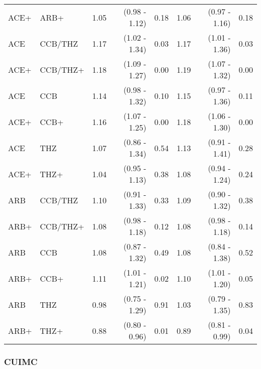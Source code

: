 \documentclass[11pt,]{article}
\begin{document}
\begin{table}[H]
{\begin{tabular}{llrrrrrr}
  ACE+ & ARB+ & 1.05 & (0.98 - 1.12) & 0.18 & 1.06 & (0.97 - 1.16) & 0.18 \\ 
  ACE & CCB/THZ & 1.17 & (1.02 - 1.34) & 0.03 & 1.17 & (1.01 - 1.36) & 0.03 \\ 
  ACE+ & CCB/THZ+ & 1.18 & (1.09 - 1.27) & 0.00 & 1.19 & (1.07 - 1.32) & 0.00 \\ 
  ACE & CCB & 1.14 & (0.98 - 1.32) & 0.10 & 1.15 & (0.97 - 1.36) & 0.11 \\ 
  ACE+ & CCB+ & 1.16 & (1.07 - 1.25) & 0.00 & 1.18 & (1.06 - 1.30) & 0.00 \\ 
  ACE & THZ & 1.07 & (0.86 - 1.34) & 0.54 & 1.13 & (0.91 - 1.41) & 0.28 \\ 
  ACE+ & THZ+ & 1.04 & (0.95 - 1.13) & 0.38 & 1.08 & (0.94 - 1.24) & 0.24 \\ 
  ARB & CCB/THZ & 1.10 & (0.91 - 1.33) & 0.33 & 1.09 & (0.90 - 1.32) & 0.38 \\ 
  ARB+ & CCB/THZ+ & 1.08 & (0.98 - 1.18) & 0.12 & 1.08 & (0.98 - 1.18) & 0.14 \\ 
  ARB & CCB & 1.08 & (0.87 - 1.32) & 0.49 & 1.08 & (0.84 - 1.38) & 0.52 \\ 
  ARB+ & CCB+ & 1.11 & (1.01 - 1.21) & 0.02 & 1.10 & (1.01 - 1.20) & 0.05 \\ 
  ARB & THZ & 0.98 & (0.75 - 1.29) & 0.91 & 1.03 & (0.79 - 1.35) & 0.83 \\ 
  ARB+ & THZ+ & 0.88 & (0.80 - 0.96) & 0.01 & 0.89 & (0.81 - 0.99) & 0.04 \\ 
    \bottomrule
  \end{tabular}
  }
\end{table}

\hypertarget{cuimc-2}{%
\subsubsection{CUIMC}\label{cuimc-2}}
\end{document}
